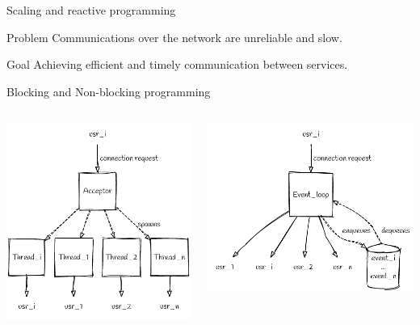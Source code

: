 \documentclass{beamer}
\begin{document}
\begin{frame}{Scaling and reactive programming}
    \begin{alertblock}{Problem}
        Communications over the network are unreliable and slow.
    \end{alertblock}
    \begin{block}{Goal}
        Achieving efficient and timely communication between services.
    \end{block}
\end{frame}
\begin{frame}{Blocking and Non-blocking programming}
    \begin{columns}
        \begin{column}{0.5\textwidth}
            \includegraphics[width=\textwidth]{assets/acceptor_system.png}
        \end{column}
        \begin{column}{0.5\textwidth}
            \includegraphics[width=\textwidth]{assets/event_queue.png}

\end{column}
\end{columns}
\end{frame}
\end{document}
